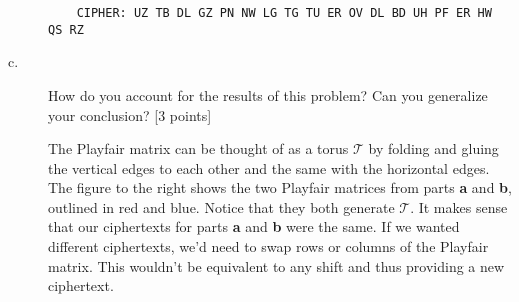 \documentclass[../hw_sols.tex]{subfiles}
\begin{document}
\begin{description}
\begin{solution}
\begin{verbatim}
    CIPHER: UZ TB DL GZ PN NW LG TG TU ER OV DL BD UH PF ER HW QS RZ
\end{verbatim}

\end{solution}


\item[c.] How do you account for the results of this problem? Can you 
generalize your conclusion? [3 points]

\begin{solution}
\newline  %
\begin{minipage}{0.55\linewidth}
The Playfair matrix can be thought of as a torus $\mathcal{T}$ by folding and 
gluing the vertical edges to each other and the same with the horizontal edges. 
The figure to the right shows the two Playfair matrices from parts \textbf{a} 
and \textbf{b}, outlined in red and blue. Notice that they both generate 
$\mathcal{T}$. It makes sense that our ciphertexts for parts \textbf{a} and 
\textbf{b} were the same. If we wanted different ciphertexts, we'd need to 
swap rows or columns of the Playfair matrix. This wouldn't be equivalent to any 
shift and thus providing a new ciphertext.
\end{minipage}
\quad
\begin{minipage}{0.4\linewidth}
\end{minipage}

\end{solution}

\end{description}
\end{document}
